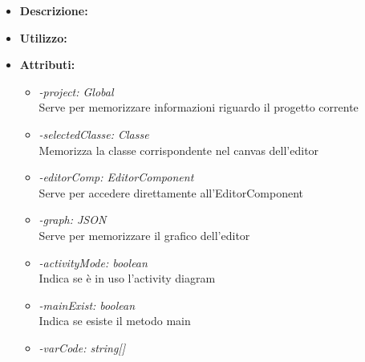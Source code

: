 \begin{itemize}
	\item \textbf{Descrizione:}\\
	
	\item \textbf{Utilizzo:}\\
	
	\item \textbf{Attributi:}
		\begin{itemize}
			\item \emph{-project: Global}\\
			Serve per memorizzare informazioni riguardo il progetto corrente
			\item \emph{-selectedClasse: Classe}\\
			Memorizza la classe corrispondente nel canvas dell'editor
			\item \emph{-editorComp: EditorComponent}\\
			Serve per accedere direttamente all'EditorComponent
			\item \emph{-graph: JSON}\\
			Serve per memorizzare il grafico dell'editor
			\item \emph{-activityMode: boolean}\\
			Indica se è in uso l'activity diagram
			\item \emph{-mainExist: boolean}\\
			Indica se esiste il metodo main
			\item \emph{-varCode: string[]}\\
			

\end{itemize}
\end{itemize}
